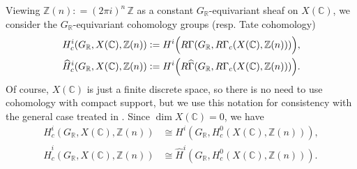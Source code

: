 \documentclass[draft]{article}
\newcommand{\CC}{\mathbb{C}}
\newcommand{\RR}{\mathbb{R}}
\newcommand{\ZZ}{\mathbb{Z}}
\newcommand{\dfn}{\mathrel{\mathop:}=}
\theoremstyle{myplain}
\theoremstyle{mydefinition}
\numberwithin{equation}{section}
\begin{document}
Viewing $\ZZ (n) \dfn (2\pi i)^n\,\ZZ$ as a constant $G_\RR$-equivariant sheaf
on $X(\CC)$, we consider the $G_\RR$-equivariant cohomology groups (resp. Tate
cohomology)
\begin{align*}
  H^i_c (G_\RR, X(\CC), \ZZ(n)) & \dfn H^i \Bigl(R\Gamma (G_\RR, R\Gamma_c (X(\CC), \ZZ(n)))\Bigr), \\
  \widehat{H}^i_c (G_\RR, X(\CC), \ZZ(n)) & \dfn H^i \Bigl(R\widehat{\Gamma} (G_\RR, R\Gamma_c (X(\CC), \ZZ(n)))\Bigr).
\end{align*}
Of course, $X(\CC)$ is just a finite discrete space, so there is no need to use
cohomology with compact support, but we use this notation for consistency
with the general case treated in \cite{Beshenov-Weil-etale-1}. Since
$\dim X(\CC) = 0$, we have
\begin{align*}
  H^i_c (G_\RR, X(\CC), \ZZ(n)) & \cong H^i (G_\RR, H^0_c (X(\CC), \ZZ(n))), \\
  \widehat{H}^i_c (G_\RR, X(\CC), \ZZ(n)) & \cong \widehat{H}^i (G_\RR, H^0_c (X(\CC), \ZZ(n))).
\end{align*}
\end{document}

